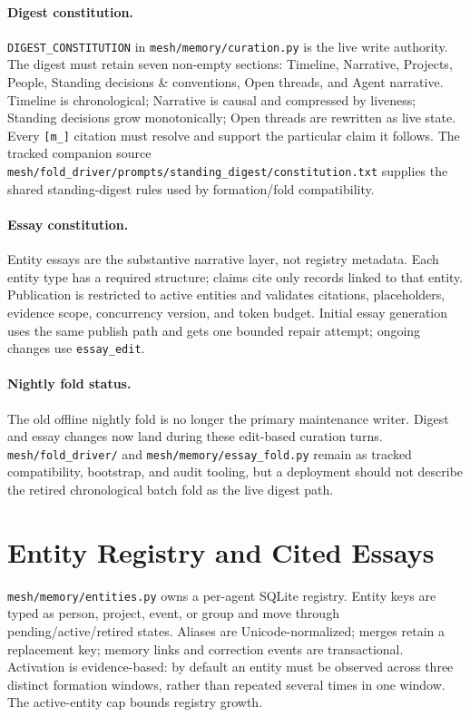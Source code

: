 \documentclass[11pt,letterpaper]{report}
\newcommand{\code}[1]{\texttt{#1}}
\begin{document}
\paragraph{Digest constitution.}
\code{DIGEST\_CONSTITUTION} in \code{mesh/memory/curation.py} is the live
write authority. The digest must retain seven non-empty sections: Timeline,
Narrative, Projects, People, Standing decisions \& conventions, Open threads,
and Agent narrative. Timeline is chronological; Narrative is causal and
compressed by liveness; Standing decisions grow monotonically; Open threads
are rewritten as live state. Every \code{[m\_<12hex>]} citation must resolve
and support the particular claim it follows. The tracked companion source
\code{mesh/fold\_driver/prompts/standing\_digest/constitution.txt} supplies
the shared standing-digest rules used by formation/fold compatibility.

\paragraph{Essay constitution.}
Entity essays are the substantive narrative layer, not registry metadata.
Each entity type has a required structure; claims cite only records linked to
that entity. Publication is restricted to active entities and validates
citations, placeholders, evidence scope, concurrency version, and token
budget. Initial essay generation uses the same publish path and gets one
bounded repair attempt; ongoing changes use \code{essay\_edit}.

\paragraph{Nightly fold status.}
The old offline nightly fold is no longer the primary maintenance writer.
Digest and essay changes now land during these edit-based curation turns.
\code{mesh/fold\_driver/} and \code{mesh/memory/essay\_fold.py} remain as
tracked compatibility, bootstrap, and audit tooling, but a deployment should
not describe the retired chronological batch fold as the live digest path.

\section{Entity Registry and Cited Essays}

\code{mesh/memory/entities.py} owns a per-agent SQLite registry. Entity keys
are typed as person, project, event, or group and move through
pending/active/retired states. Aliases are Unicode-normalized; merges retain a
replacement key; memory links and correction events are transactional.
Activation is evidence-based: by default an entity must be observed across
three distinct formation windows, rather than repeated several times in one
window. The active-entity cap bounds registry growth.
\end{document}
